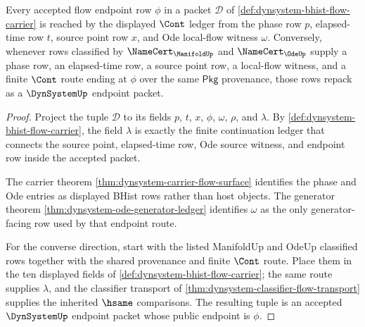 \begin{theorem}
\label{thm:dynsystem-flow-endpoint-coverage}
Every accepted flow endpoint row $\phi$ in a packet $\mathcal{D}$ of
\autoref{def:dynsystem-bhist-flow-carrier} is reached by the displayed
$\Cont$ ledger from the phase row $p$, elapsed-time row $t$, source point row
$x$, and Ode local-flow witness $\omega$. Conversely, whenever rows classified
by $\NameCert_{\ManifoldUp}$ and $\NameCert_{\OdeUp}$ supply a phase row, an
elapsed-time row, a source point row, a local-flow witness, and a finite
$\Cont$ route ending at $\phi$ over the same $\mathsf{Pkg}$ provenance, those
rows repack as a $\DynSystemUp$ endpoint packet.
\end{theorem}
\begin{proof}
Project the tuple $\mathcal{D}$ to its fields $p$, $t$, $x$, $\phi$, $\omega$,
$\rho$, and $\lambda$. By \autoref{def:dynsystem-bhist-flow-carrier}, the field
$\lambda$ is exactly the finite continuation ledger that connects the source
point, elapsed-time row, Ode source witness, and endpoint row inside the
accepted packet.

The carrier theorem \autoref{thm:dynsystem-carrier-flow-surface} identifies the
phase and Ode entries as displayed BHist rows rather than host objects. The
generator theorem \autoref{thm:dynsystem-ode-generator-ledger} identifies
$\omega$ as the only generator-facing row used by that endpoint route.

For the converse direction, start with the listed ManifoldUp and OdeUp
classified rows together with the shared provenance and finite $\Cont$ route.
Place them in the ten displayed fields of
\autoref{def:dynsystem-bhist-flow-carrier}; the same route supplies $\lambda$,
and the classifier transport of
\autoref{thm:dynsystem-classifier-flow-transport} supplies the inherited
$\hsame$ comparisons. The resulting tuple is an accepted $\DynSystemUp$
endpoint packet whose public endpoint is $\phi$.
\end{proof}


